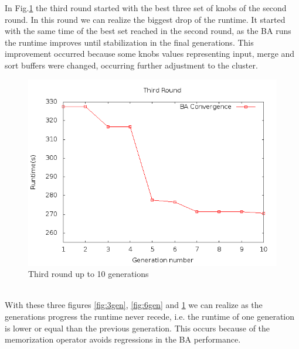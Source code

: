In Fig.\ref{fig:10gen} the third round started  with the best three set of knobs
of the second round. In this round we can realize the biggest drop of the runtime.
It started with the same time of the best set reached in the second round,
as the BA runs the runtime improves until stabilization in the final generations.
This improvement occurred because some knobs values representing input, merge and
sort buffers were changed, occurring further adjustment to the cluster. 
\\
\begin{figure}[htbp]
\begin{center}
	\includegraphics[scale=0.7]{graphics/img/10gen.png}
\caption{Third round up to 10 generations} \label{fig:10gen}
\end{center}
\end{figure}
\\

With these three figures \ref{fig:3gen}, \ref{fig:6gen} and \ref{fig:10gen}
we can realize as the generations progress the runtime
never recede, i.e. the runtime of one generation is lower or equal than the
previous generation. This occurs because of the memorization operator
avoids regressions in the BA performance.
\\
\\
\\
\\
\\
\\
\\
\\
\\

